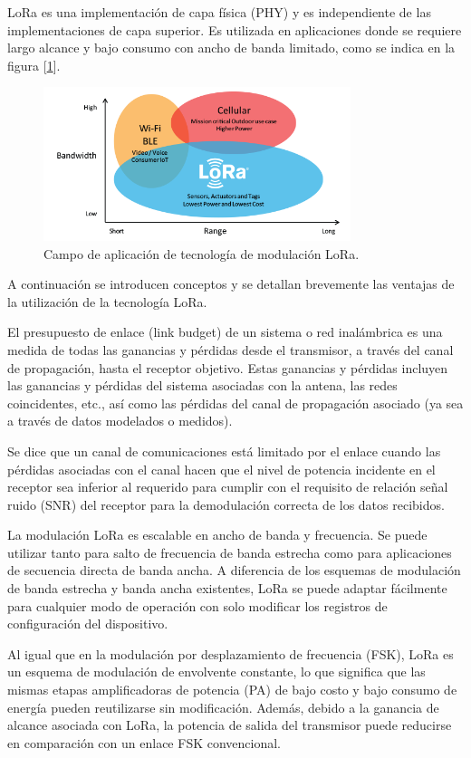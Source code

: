 LoRa es una implementación de capa física (PHY) y es independiente de las implementaciones de capa superior. Es utilizada en aplicaciones donde se requiere largo
alcance y bajo consumo con ancho de banda limitado, como se indica en la figura [\ref{fig:lora}].

\begin{figure}[ht!]
	\centering
	\includegraphics[width=0.8\textwidth]{./Figures/loragrafico.png}
	\caption{Campo de aplicación de tecnología de modulación LoRa.}
	\label{fig:lora}
\end{figure}

A continuación se introducen conceptos y se detallan brevemente las ventajas de la utilización de la tecnología LoRa.

El presupuesto de enlace (link budget) de un sistema o red inalámbrica es una medida de todas las ganancias y pérdidas desde el transmisor, a través del canal de propagación, hasta el receptor objetivo. Estas ganancias y pérdidas incluyen las ganancias y pérdidas del sistema asociadas con la antena, las redes coincidentes, etc., así como las pérdidas del canal de propagación asociado (ya sea a través de datos modelados o medidos).

Se dice que un canal de comunicaciones está limitado por el enlace cuando las pérdidas asociadas con el canal hacen que el nivel de potencia incidente en el receptor sea inferior al requerido para cumplir con el requisito de relación señal ruido (SNR) del receptor para la demodulación correcta de los datos recibidos.

La modulación LoRa es escalable en ancho de banda y frecuencia. Se puede utilizar tanto para salto de frecuencia de banda estrecha como para aplicaciones de secuencia directa de banda ancha. A diferencia de los esquemas de modulación de banda estrecha y banda ancha existentes, LoRa se puede adaptar fácilmente para cualquier modo de operación con solo modificar los registros de configuración del dispositivo.

Al igual que en la modulación por desplazamiento de frecuencia (FSK), LoRa es un esquema de modulación de envolvente constante, lo que significa que las mismas etapas amplificadoras de potencia (PA) de bajo costo y bajo consumo de energía pueden reutilizarse sin modificación. Además, debido a la ganancia de alcance asociada con LoRa, la potencia de salida del transmisor puede reducirse en comparación con un enlace FSK convencional.


